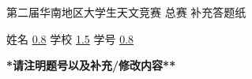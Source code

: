 \documentclass[CJK]{article}
\begin{document}
\bch
\bcenter

第二届华南地区大学生天文竞赛 总赛 补充答题纸

{\vskip 0.07in}

姓名 \uline{0.8} {\hskip 0.2in}  学校 \uline{1.5}{\hskip 0.2in} 学号 \uline{0.8}{\hskip 0.2in}

{\vskip 0.07in}

{\bf **请注明题号以及补充/修改内容**}
\ecenter


\ech
\end{document}
